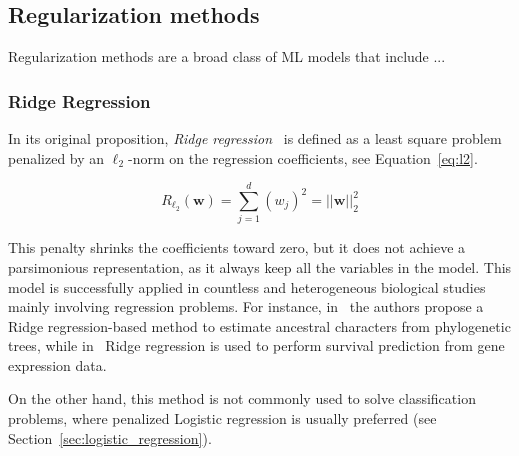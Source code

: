 	    \subsection{Regularization methods} \label{subsec:regularization_methods}
	    Regularization methods are a broad class of ML models that include ...

			\subsubsection{Ridge Regression}

				
			In its original proposition, \textit{Ridge regression}~\cite{hoerl1970ridge} is defined as a least square problem penalized by an $\ell_2$-norm on the regression coefficients, see Equation~\eqref{eq:l2}.

			\begin{equation}\label{eq:l2}
				R_{\mbox{$\ell_2$}}(\bm{w}) = \sum_{j=1}^d (w_j)^2 = ||\bm{w}||_2^2
			\end{equation}

			This penalty shrinks the coefficients toward zero, but it does not achieve a parsimonious representation, as it always keep all the variables in the model.
			This model is successfully applied in countless and heterogeneous biological studies mainly involving regression problems.
			For instance, in~\cite{kratsch2014} the authors propose a Ridge regression-based method to estimate ancestral characters from phylogenetic trees, while in~\cite{bovelstad2007} Ridge regression is used to perform survival prediction from gene expression data.

			On the other hand, this method is not commonly used to solve classification problems, where penalized Logistic regression is usually preferred (see Section~\ref{sec:logistic_regression}).

